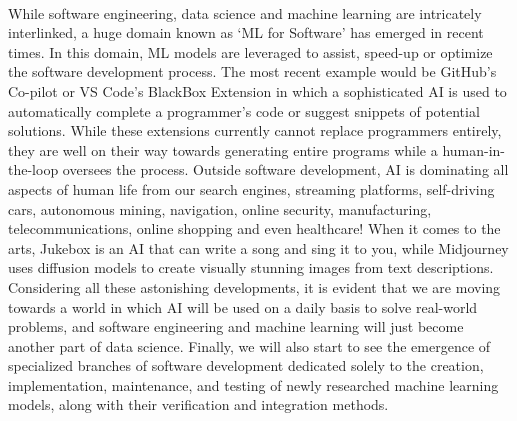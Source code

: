 \documentclass[11pt]{article}
\begin{document}
\\
\par{While software engineering, data science and machine learning are intricately interlinked, a huge domain known as ‘ML for Software’ has emerged in recent times. In this domain, ML models are leveraged to assist, speed-up or optimize the software development process. The most recent example would be GitHub’s Co-pilot or VS Code’s BlackBox Extension in which a sophisticated AI is used to automatically complete a programmer’s code or suggest snippets of potential solutions. While these extensions currently cannot replace programmers entirely, they are well on their way towards generating entire programs while a human-in-the-loop oversees the process. Outside software development, AI is dominating all aspects of human life from our search engines, streaming platforms, self-driving cars, autonomous mining, navigation, online security, manufacturing, telecommunications, online shopping and even healthcare! When it comes to the arts, Jukebox is an AI that can write a song and sing it to you, while Midjourney uses diffusion models to create visually stunning images from text descriptions. Considering all these astonishing developments, it is evident that we are moving towards a world in which AI will be used on a daily basis to solve real-world problems, and software engineering and machine learning will just become another part of data science. Finally, we will also start to see the emergence of specialized branches of software development dedicated solely to the creation, implementation, maintenance, and testing of newly researched machine learning models, along with their verification and integration methods. }
\\
\end{document}
